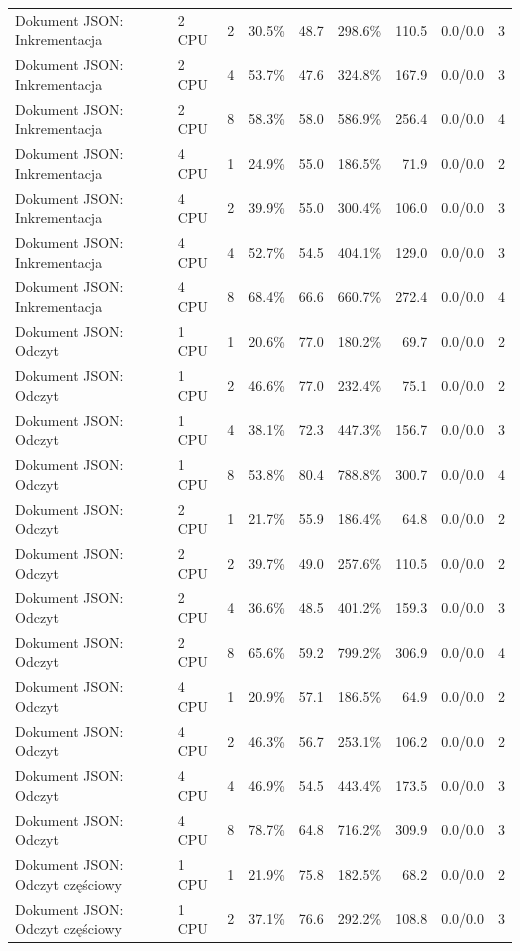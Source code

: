 \begin{table}[ht]
{\begin{tabular}{llcrrrrcc}
Dokument JSON: Inkrementacja & 2 CPU & 2 & 30.5\% & 48.7 & 298.6\% & 110.5 & 0.0/0.0 & 3 \\
Dokument JSON: Inkrementacja & 2 CPU & 4 & 53.7\% & 47.6 & 324.8\% & 167.9 & 0.0/0.0 & 3 \\
Dokument JSON: Inkrementacja & 2 CPU & 8 & 58.3\% & 58.0 & 586.9\% & 256.4 & 0.0/0.0 & 4 \\
Dokument JSON: Inkrementacja & 4 CPU & 1 & 24.9\% & 55.0 & 186.5\% & 71.9 & 0.0/0.0 & 2 \\
Dokument JSON: Inkrementacja & 4 CPU & 2 & 39.9\% & 55.0 & 300.4\% & 106.0 & 0.0/0.0 & 3 \\
Dokument JSON: Inkrementacja & 4 CPU & 4 & 52.7\% & 54.5 & 404.1\% & 129.0 & 0.0/0.0 & 3 \\
Dokument JSON: Inkrementacja & 4 CPU & 8 & 68.4\% & 66.6 & 660.7\% & 272.4 & 0.0/0.0 & 4 \\
Dokument JSON: Odczyt & 1 CPU & 1 & 20.6\% & 77.0 & 180.2\% & 69.7 & 0.0/0.0 & 2 \\
Dokument JSON: Odczyt & 1 CPU & 2 & 46.6\% & 77.0 & 232.4\% & 75.1 & 0.0/0.0 & 2 \\
Dokument JSON: Odczyt & 1 CPU & 4 & 38.1\% & 72.3 & 447.3\% & 156.7 & 0.0/0.0 & 3 \\
Dokument JSON: Odczyt & 1 CPU & 8 & 53.8\% & 80.4 & 788.8\% & 300.7 & 0.0/0.0 & 4 \\
Dokument JSON: Odczyt & 2 CPU & 1 & 21.7\% & 55.9 & 186.4\% & 64.8 & 0.0/0.0 & 2 \\
Dokument JSON: Odczyt & 2 CPU & 2 & 39.7\% & 49.0 & 257.6\% & 110.5 & 0.0/0.0 & 2 \\
Dokument JSON: Odczyt & 2 CPU & 4 & 36.6\% & 48.5 & 401.2\% & 159.3 & 0.0/0.0 & 3 \\
Dokument JSON: Odczyt & 2 CPU & 8 & 65.6\% & 59.2 & 799.2\% & 306.9 & 0.0/0.0 & 4 \\
Dokument JSON: Odczyt & 4 CPU & 1 & 20.9\% & 57.1 & 186.5\% & 64.9 & 0.0/0.0 & 2 \\
Dokument JSON: Odczyt & 4 CPU & 2 & 46.3\% & 56.7 & 253.1\% & 106.2 & 0.0/0.0 & 2 \\
Dokument JSON: Odczyt & 4 CPU & 4 & 46.9\% & 54.5 & 443.4\% & 173.5 & 0.0/0.0 & 3 \\
Dokument JSON: Odczyt & 4 CPU & 8 & 78.7\% & 64.8 & 716.2\% & 309.9 & 0.0/0.0 & 3 \\
Dokument JSON: Odczyt częściowy & 1 CPU & 1 & 21.9\% & 75.8 & 182.5\% & 68.2 & 0.0/0.0 & 2 \\
Dokument JSON: Odczyt częściowy & 1 CPU & 2 & 37.1\% & 76.6 & 292.2\% & 108.8 & 0.0/0.0 & 3 \\

\end{tabular}}
\end{table}
